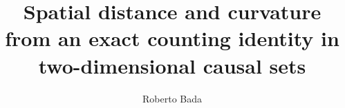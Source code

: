 \documentclass[12pt]{iopart} %
\providecommand{\DIFaddtex}[1]{{\protect\color{blue}\uwave{#1}}} %
\providecommand{\DIFaddbegin}{} %
\providecommand{\DIFaddend}{} %
\providecommand{\DIFdelbegin}{} %
\providecommand{\DIFdelend}{} %
\providecommand{\DIFadd}[1]{\texorpdfstring{\DIFaddtex{#1}}{#1}} %
\providecommand{\DIFscaledelfig}{0.5}
\newlength{\DIFdelgraphicswidth} %
\newlength{\DIFdelgraphicsheight} %
\providecommand{\DIFaddincludegraphics}[2][]{{\color{blue}\fbox{\DIFOincludegraphics[#1]{#2}}}} %
\providecommand{\DIFdelincludegraphics}[2][]{%
\sbox{\DIFdelgraphicsbox}{\DIFOincludegraphics[#1]{#2}}%
\settoboxwidth{\DIFdelgraphicswidth}{\DIFdelgraphicsbox} %
\settoboxtotalheight{\DIFdelgraphicsheight}{\DIFdelgraphicsbox} %
\scalebox{\DIFscaledelfig}{%
\parbox[b]{\DIFdelgraphicswidth}{\usebox{\DIFdelgraphicsbox}\\[-\baselineskip] \rule{\DIFdelgraphicswidth}{0em}}\llap{\resizebox{\DIFdelgraphicswidth}{\DIFdelgraphicsheight}{%
\setlength{\unitlength}{\DIFdelgraphicswidth}%
\begin{picture}(1,1)%
\thicklines\linethickness{2pt} %
{\color[rgb]{1,0,0}\put(0,0){\framebox(1,1){}}}%
{\color[rgb]{1,0,0}\put(0,0){\line( 1,1){1}}}%
{\color[rgb]{1,0,0}\put(0,1){\line(1,-1){1}}}%
\end{picture}%
}\hspace*{3pt}}} %
} %
\DeclareRobustCommand{\DIFaddbegin}{\DIFOaddbegin \let\includegraphics\DIFaddincludegraphics} %
\DeclareRobustCommand{\DIFaddend}{\DIFOaddend \let\includegraphics\DIFOincludegraphics} %
\DeclareRobustCommand{\DIFdelbegin}{\DIFOdelbegin \let\includegraphics\DIFdelincludegraphics} %
\DeclareRobustCommand{\DIFdelend}{\DIFOaddend \let\includegraphics\DIFOincludegraphics} %
\begin{document}
\DIFdelbegin %
\DIFdelend \DIFaddbegin \title[Spatial distance and curvature from a counting identity]{\DIFaddend Spatial distance and curvature from an exact counting identity in two-dimensional causal sets}

\author{Roberto Bada\DIFaddbegin \DIFadd{$^{1,2}$}\DIFaddend }
\DIFdelbegin %
\DIFdelend 

\DIFdelbegin %
\DIFdelend \DIFaddbegin \address{$^1$ SapereIA, Barcelona, Spain}
\address{$^2$ Institute of Cosmos Sciences, University of Barcelona (ICCUB), Barcelona, Spain}
\DIFaddend 
\end{document}
